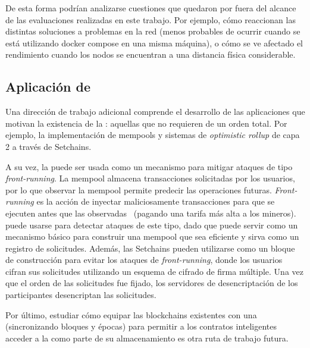 De esta forma podrían analizarse cuestiones que quedaron por fuera del alcance de las
evaluaciones realizadas en este trabajo. Por ejemplo, cómo reaccionan las distintas
soluciones a problemas en la red (menos probables de ocurrir cuando se está utilizando
docker compose en una misma máquina), o cómo se ve afectado el rendimiento cuando
los nodos se encuentran a una distancia física considerable. 

\subsection{Aplicación de \hashchain}
Una dirección de trabajo adicional comprende el desarrollo de las
aplicaciones que motivan la existencia de la \setchain: aquellas que no requieren de
un orden total.
Por ejemplo, la implementación de mempools y sistemas de
\textit{optimistic rollup} de capa 2 a través de Setchains.

A su vez, la \setchain puede ser usada como un mecanismo para mitigar ataques de tipo
\textit{front-running}. La mempool almacena transacciones solicitadas por los usuarios,
por lo que observar
la mempool permite predecir las operaciones futuras. \emph{Front-running} es la acción
de inyectar maliciosamente transacciones
para que se ejecuten antes que las observadas~\cite{Daian2020FlashBoys, Ferreira2021Frontrunner}
(pagando una tarifa más alta a los mineros).
%
\setchain puede usarse para detectar ataques de este tipo, dado que puede servir
como un
mecanismo básico para construir una mempool que sea eficiente y sirva como un registro de
solicitudes.
%
Además, las Setchains pueden utilizarse como un bloque de construcción para
evitar los ataques de \textit{front-running}, donde los usuarios cifran sus solicitudes
utilizando un esquema de
cifrado de firma múltiple.
%
Una vez que el orden de las solicitudes fue fijado, los servidores
de desencriptación de los participantes desencriptan
las solicitudes.

%
Por último, estudiar cómo equipar las blockchains existentes con una \setchain (sincronizando bloques
y épocas) para permitir a los contratos inteligentes acceder a la \setchain como parte de su almacenamiento
es otra ruta de trabajo futura.